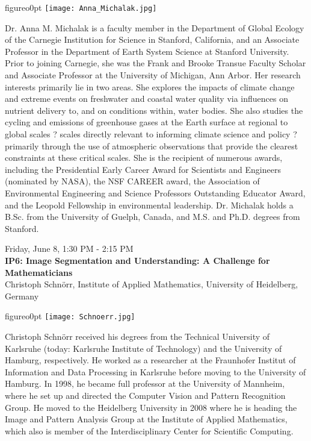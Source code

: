 \begin{wrapfloat}{figure}{o}{0pt}
\texttt{[image: Anna\_Michalak.jpg]}
\end{wrapfloat}
Dr. Anna M. Michalak is a faculty member in the Department of Global Ecology of the Carnegie Institution for Science in Stanford, California, and an Associate Professor in the Department of Earth System Science at Stanford University. Prior to joining Carnegie, she was the Frank and Brooke Transue Faculty Scholar and Associate Professor at the University of Michigan, Ann Arbor. Her research interests primarily lie in two areas. She explores the impacts of climate change and extreme events on freshwater and coastal water quality via influences on nutrient delivery to, and on conditions within, water bodies. She also studies the cycling and emissions of greenhouse gases at the Earth surface at regional to global scales ? scales directly relevant to informing climate science and policy ? primarily through the use of atmospheric observations that provide the clearest constraints at these critical scales. She is the recipient of numerous awards, including the Presidential Early Career Award for Scientists and Engineers (nominated by NASA), the NSF CAREER award, the Association of Environmental Engineering and Science Professors Outstanding Educator Award, and the Leopold Fellowship in environmental leadership. Dr. Michalak holds a B.Sc. from the University of Guelph, Canada, and M.S. and Ph.D. degrees from Stanford.

\newpage\vspace{2cm}
\begin{center}{\Large{
Friday, June 8, 1:30 PM - 2:15 PM \\
\textbf{IP6: Image Segmentation and Understanding: A Challenge for Mathematicians}\\
Christoph Schn\"{o}rr, Institute of Applied Mathematics, University of Heidelberg, Germany}}
\end{center}
\vspace{1cm}

\begin{wrapfloat}{figure}{o}{0pt}
\texttt{[image: Schnoerr.jpg]}
\end{wrapfloat}
Christoph Schn\"{o}rr received his degrees from the Technical University of Karlsruhe (today: Karlsruhe Institute of Technology) and the University of Hamburg, respectively. He worked as a researcher at the Fraunhofer Institut of Information and Data Processing in Karlsruhe before moving to the University of Hamburg. In 1998, he became full professor at the University of Mannheim, where he set up and directed the Computer Vision and Pattern Recognition Group. He moved to the Heidelberg University in 2008 where he is heading the Image and Pattern Analysis Group at the Institute of Applied Mathematics, which also is member of the Interdisciplinary Center for Scientific Computing.

